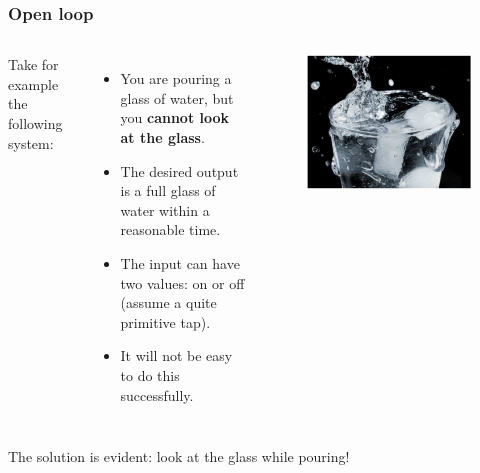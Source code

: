 \begin{frame}
	\frametitle{Open loop}
	\begin{columns}[c]
		
		Take for example the following system:\\
		\begin{itemize}
			\item You are pouring a glass of water, but you \textbf{cannot look at the glass}.
			\item The desired output is a full glass of water within a reasonable time.
			\item The input can have two values: on or off (assume a quite primitive tap).
			\item It will not be easy to do this successfully.
		\end{itemize}
		
		\begin{figure}
			\includegraphics[width=1\linewidth]{glass}
		\end{figure}
		
	\end{columns}
	\bigskip
	The solution is evident: look at the glass while pouring!
\end{frame}

